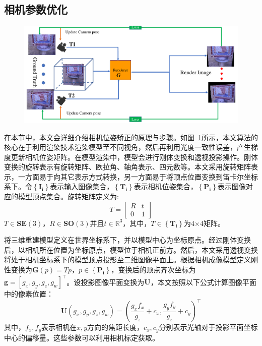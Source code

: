 \subsection{相机参数优化}
\begin{figure}[ht]
    \centering
    \includegraphics[width=1\columnwidth]{pic/work1/cameras.pdf}
    \label{fig:cameras}
\end{figure}

在本节中，本文会详细介绍相机位姿矫正的原理与步骤。如图~\ref{fig:cameras}所示，本文算法的核心在于利用渲染技术渲染模型至不同视角，然后再利用光度一致性误差，产生梯度更新相机位姿矩阵。在模型渲染中，模型会进行刚体变换和透视投影操作。刚体变换的旋转表示有旋转矩阵、欧拉角、轴角表示、四元数等。本文采用旋转矩阵表示，一方面易于向其它表示方式转换，另一方面易于将顶点位置变换到笛卡尔坐标系下。令$ \left \{ \mathbf{I_i} \right \} $表示输入图像集合，$\left \{ \mathbf{T_i} \right \}$表示相机位姿集合，$\left \{ \mathbf{P_i} \right \}$表示图像对应的模型顶点集合。旋转矩阵定义为:
\begin{equation}
	T = \left[\begin{array}{cc}
		R & t \\
		0 & 1
	\end{array}\right]
\end{equation}
$T \in \mathbf{SE}(3)$，$R \in \mathbf{SO}(3)$并且$t\in\mathbb{R}^3$，其中，$T \in \left \{ \mathbf{T_i} \right \}$为4$\times$4矩阵。\par 
将三维重建模型定义在世界坐标系下，并以模型中心为坐标原点。经过刚体变换后，以相机所在位置为坐标原点，模型位于相机正前方。然后，本文采用透视变换将处于相机坐标系下的模型顶点投影至二维图像平面上。根据相机成像模型定义刚性变换为$\mathbf{G}(p)=Tp$，$p \in \left \{ \mathbf{P_i} \right \}$，变换后的顶点齐次坐标为$\mathbf{g}=[g_x, g_y, g_z,g_w]^\top$。设投影图像平面变换为$\mathbf{U}$，本文按照以下公式计算图像平面中的像素位置：
\begin{equation}
\mathbf{U}\left(g_{x}, g_{y}, g_{z}, g_{w}\right)=\left(\frac{g_{x} f_{x}}{g_{z}}+c_{x}, \frac{g_{y} f_{y}}{g_{z}}+c_{y}\right)^{\top} \label{project}
\end{equation}
其中，$f_x,f_y$表示相机在$x,y$方向的焦距长度，$c_x,c_y$分别表示光轴对于投影平面坐标中心的偏移量。这些参数可以利用相机标定获取。\par


